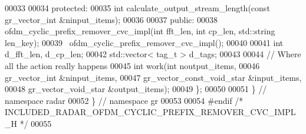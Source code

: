 \begin{DoxyCode}
00033 
00034      \textcolor{keyword}{protected}:
00035       \textcolor{keywordtype}{int} calculate_output_stream_length(\textcolor{keyword}{const} gr\_vector\_int &ninput\_items);
00036 
00037      \textcolor{keyword}{public}:
00038       ofdm_cyclic_prefix_remover_cvc_impl(\textcolor{keywordtype}{int} fft\_len, \textcolor{keywordtype}{int} cp\_len, std::string len\_key);
00039       ~ofdm_cyclic_prefix_remover_cvc_impl();
00040       
00041       \textcolor{keywordtype}{int} d_fft_len, d_cp_len;
00042       std::vector< tag\_t > d_tags;
00043 
00044       \textcolor{comment}{// Where all the action really happens}
00045       \textcolor{keywordtype}{int} work(\textcolor{keywordtype}{int} noutput\_items,
00046                gr\_vector\_int &ninput\_items,
00047                gr\_vector\_const\_void\_star &input\_items,
00048                gr\_vector\_void\_star &output\_items);
00049     \};
00050 
00051   \} \textcolor{comment}{// namespace radar}
00052 \} \textcolor{comment}{// namespace gr}
00053 
00054 \textcolor{preprocessor}{#endif }\textcolor{comment}{/* INCLUDED\_RADAR\_OFDM\_CYCLIC\_PREFIX\_REMOVER\_CVC\_IMPL\_H */}\textcolor{preprocessor}{}
00055 
\end{DoxyCode}
